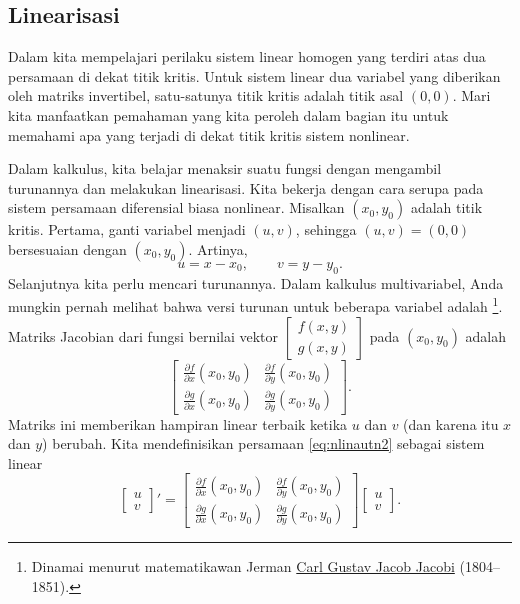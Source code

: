 \subsection{Linearisasi}

Dalam  kita mempelajari perilaku sistem linear
homogen yang terdiri atas dua persamaan di dekat titik kritis. Untuk sistem linear
dua variabel yang diberikan oleh matriks invertibel, satu-satunya titik kritis adalah
titik asal $(0,0)$.
Mari kita manfaatkan pemahaman yang kita peroleh dalam bagian itu
untuk memahami apa yang terjadi di dekat titik kritis sistem nonlinear.

Dalam kalkulus, kita belajar menaksir suatu fungsi dengan mengambil
turunannya dan melakukan linearisasi. Kita bekerja dengan cara serupa pada sistem persamaan diferensial biasa nonlinear.
Misalkan $(x_0,y_0)$ adalah titik kritis.
Pertama, ganti variabel menjadi $(u,v)$, sehingga $(u,v)=(0,0)$ bersesuaian dengan
$(x_0,y_0)$. Artinya,
\begin{equation*}
u=x-x_0, \qquad v=y-y_0 .
\end{equation*}
Selanjutnya kita perlu mencari turunannya. Dalam kalkulus multivariabel, Anda mungkin
pernah melihat bahwa versi turunan untuk beberapa variabel adalah
\emph{}%
\footnote{Dinamai menurut matematikawan Jerman
\href{https://en.wikipedia.org/wiki/Carl_Gustav_Jacob_Jacobi}{Carl Gustav Jacob Jacobi}
(1804--1851).}. Matriks Jacobian dari
fungsi bernilai vektor
$\left[ \begin{smallmatrix} f(x,y) \\ g(x,y) \end{smallmatrix} \right]$
pada $(x_0,y_0)$ adalah
\begin{equation*}
\begin{bmatrix}
\frac{\partial f}{\partial x}(x_0,y_0) &
\frac{\partial f}{\partial y}(x_0,y_0) \\
\frac{\partial g}{\partial x}(x_0,y_0) &
\frac{\partial g}{\partial y}(x_0,y_0)
\end{bmatrix} .
\end{equation*}
Matriks ini memberikan hampiran linear terbaik ketika $u$ dan $v$ (dan
karena itu $x$ dan $y$) berubah.
Kita mendefinisikan \emph{} persamaan
\eqref{eq:nlinautn2} sebagai sistem linear
\begin{equation*}
\begin{bmatrix} u \\ v \end{bmatrix} ' =
\begin{bmatrix}
\frac{\partial f}{\partial x}(x_0,y_0) &
\frac{\partial f}{\partial y}(x_0,y_0) \\
\frac{\partial g}{\partial x}(x_0,y_0) &
\frac{\partial g}{\partial y}(x_0,y_0)
\end{bmatrix} 
\begin{bmatrix} u \\ v \end{bmatrix} .
\end{equation*}


